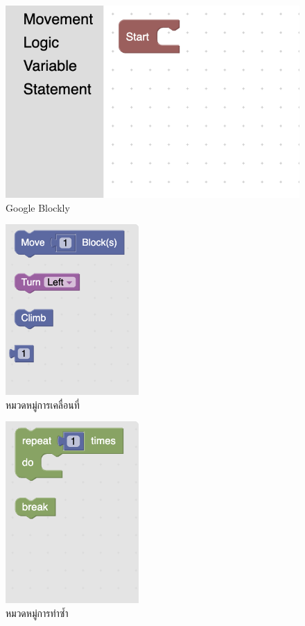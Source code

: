 \begin{figure}[H]
    \begin{center}
    \includegraphics{pic-toro/block_category/webpanel.png}
    \end{center}
    \caption[Google Blockly]{Google Blockly}
    \label{blocklywebview}
\end{figure}
\begin{figure}[H]
    \begin{center}
    \includegraphics[width=2in]{pic-toro/block_category/movementCat.png}
    \end{center}
    \caption[หมวดหมู่การเคลื่อนที่]{หมวดหมู่การเคลื่อนที่}
    \label{movementCat}
\end{figure}
\begin{figure}[H]
    \begin{center}
    \includegraphics[width=2in]{pic-toro/block_category/repeatCat.png}
    \end{center}
    \caption[หมวดหมู่การทำซ้ำ]{หมวดหมู่การทำซ้ำ}
    \label{repeatCat}
\end{figure}
